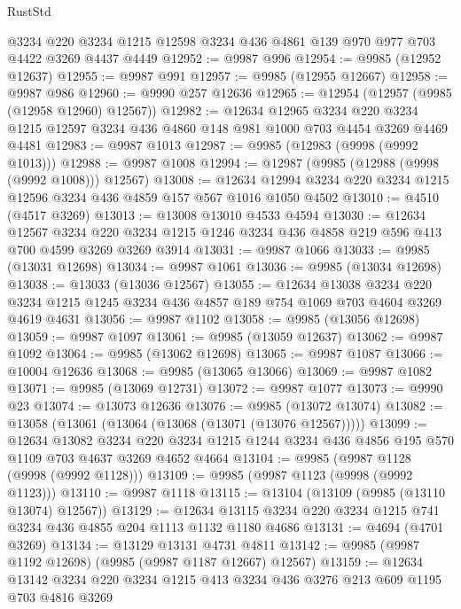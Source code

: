 \begin{lexlean}{RustStd}
\begin{coremodule}
    @3234
    @220
    @3234
    @1215
    @12598
    @3234
    @436
    @4861
    @139
    @970
    @977
    @703
    @4422
    @3269
    @4437
    @4449
@12952 := @9987 @996
@12954 := @9985 (@12952 @12637)
@12955 := @9987 @991
@12957 := @9985 (@12955 @12667)
@12958 := @9987 @986
@12960 := @9990 @257 @12636
@12965 := @12954 (@12957 (@9985 (@12958 @12960) @12567))
@12982 := @12634
    @12965
    @3234
    @220
    @3234
    @1215
    @12597
    @3234
    @436
    @4860
    @148
    @981
    @1000
    @703
    @4454
    @3269
    @4469
    @4481
@12983 := @9987 @1013
@12987 := @9985 (@12983 (@9998 (@9992 @1013)))
@12988 := @9987 @1008
@12994 := @12987 (@9985 (@12988 (@9998 (@9992 @1008))) @12567)
@13008 := @12634 @12994 @3234 @220 @3234 @1215 @12596 @3234 @436 @4859 @157 @567 @1016 @1050 @4502
@13010 := @4510 (@4517 @3269)
@13013 := @13008 @13010 @4533 @4594
@13030 := @12634
    @12567
    @3234
    @220
    @3234
    @1215
    @1246
    @3234
    @436
    @4858
    @219
    @596
    @413
    @700
    @4599
    @3269
    @3269
    @3914
@13031 := @9987 @1066
@13033 := @9985 (@13031 @12698)
@13034 := @9987 @1061
@13036 := @9985 (@13034 @12698)
@13038 := @13033 (@13036 @12567)
@13055 := @12634
    @13038
    @3234
    @220
    @3234
    @1215
    @1245
    @3234
    @436
    @4857
    @189
    @754
    @1069
    @703
    @4604
    @3269
    @4619
    @4631
@13056 := @9987 @1102
@13058 := @9985 (@13056 @12698)
@13059 := @9987 @1097
@13061 := @9985 (@13059 @12637)
@13062 := @9987 @1092
@13064 := @9985 (@13062 @12698)
@13065 := @9987 @1087
@13066 := @10004 @12636
@13068 := @9985 (@13065 @13066)
@13069 := @9987 @1082
@13071 := @9985 (@13069 @12731)
@13072 := @9987 @1077
@13073 := @9990 @23
@13074 := @13073 @12636
@13076 := @9985 (@13072 @13074)
@13082 := @13058 (@13061 (@13064 (@13068 (@13071 (@13076 @12567)))))
@13099 := @12634
    @13082
    @3234
    @220
    @3234
    @1215
    @1244
    @3234
    @436
    @4856
    @195
    @570
    @1109
    @703
    @4637
    @3269
    @4652
    @4664
@13104 := @9985 (@9987 @1128 (@9998 (@9992 @1128)))
@13109 := @9985 (@9987 @1123 (@9998 (@9992 @1123)))
@13110 := @9987 @1118
@13115 := @13104 (@13109 (@9985 (@13110 @13074) @12567))
@13129 := @12634 @13115 @3234 @220 @3234 @1215 @741 @3234 @436 @4855 @204 @1113 @1132 @1180 @4686
@13131 := @4694 (@4701 @3269)
@13134 := @13129 @13131 @4731 @4811
@13142 := @9985 (@9987 @1192 @12698) (@9985 (@9987 @1187 @12667) @12567)
@13159 := @12634
    @13142
    @3234
    @220
    @3234
    @1215
    @413
    @3234
    @436
    @3276
    @213
    @609
    @1195
    @703
    @4816
    @3269

\end{coremodule}
\end{lexlean}
